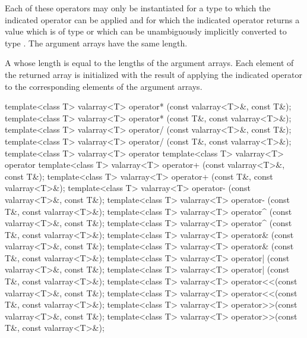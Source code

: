 \begin{itemdescr}
\pnum
\requires
Each of these operators may only be instantiated for a type 
to which the indicated operator can be applied and for which the indicated
operator returns a value which is of type  or which
can be unambiguously implicitly converted to type .
The argument arrays have the same length.

\pnum
\returns
A  whose length is equal to the
lengths of the argument arrays.
Each element of the returned array is
initialized with the result of applying the indicated operator to the
corresponding elements of the argument arrays.
\end{itemdescr}

%
%
%
%
%
%
%
%
%
%
\begin{itemdecl}
template<class T> valarray<T> operator* (const valarray<T>&, const T&);
template<class T> valarray<T> operator* (const T&, const valarray<T>&);
template<class T> valarray<T> operator/ (const valarray<T>&, const T&);
template<class T> valarray<T> operator/ (const T&, const valarray<T>&);
template<class T> valarray<T> operator%
template<class T> valarray<T> operator%
template<class T> valarray<T> operator+ (const valarray<T>&, const T&);
template<class T> valarray<T> operator+ (const T&, const valarray<T>&);
template<class T> valarray<T> operator- (const valarray<T>&, const T&);
template<class T> valarray<T> operator- (const T&, const valarray<T>&);
template<class T> valarray<T> operator^ (const valarray<T>&, const T&);
template<class T> valarray<T> operator^ (const T&, const valarray<T>&);
template<class T> valarray<T> operator& (const valarray<T>&, const T&);
template<class T> valarray<T> operator& (const T&, const valarray<T>&);
template<class T> valarray<T> operator| (const valarray<T>&, const T&);
template<class T> valarray<T> operator| (const T&, const valarray<T>&);
template<class T> valarray<T> operator<<(const valarray<T>&, const T&);
template<class T> valarray<T> operator<<(const T&, const valarray<T>&);
template<class T> valarray<T> operator>>(const valarray<T>&, const T&);
template<class T> valarray<T> operator>>(const T&, const valarray<T>&);
\end{itemdecl}

